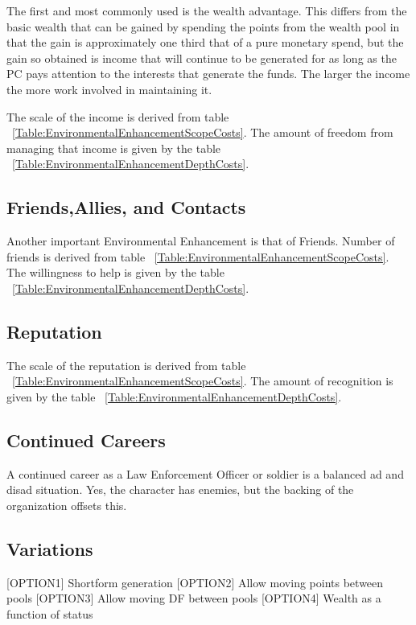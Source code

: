 The first and most commonly used is the wealth advantage. This differs
from the basic wealth that can be gained by spending the points from the
wealth pool in that the gain is approximately one third that of a pure
monetary spend, but the gain so obtained is income that will continue to
be generated for as long as the PC pays attention to the interests that
generate the funds. The larger the income the more work involved in
maintaining it.

The scale of the income is derived from table ~\ref{Table:EnvironmentalEnhancementScopeCosts}. The amount of
freedom from managing that income is given by the table
~\ref{Table:EnvironmentalEnhancementDepthCosts}.

\subsection{Friends,Allies, and Contacts}

Another important Environmental Enhancement is that of Friends. 
Number of friends is derived from table
~\ref{Table:EnvironmentalEnhancementScopeCosts}. The willingness to help 
is given by the table
~\ref{Table:EnvironmentalEnhancementDepthCosts}.

\subsection{Reputation}

The scale of the reputation is derived from table ~\ref{Table:EnvironmentalEnhancementScopeCosts}. The amount of
recognition is given by the table ~\ref{Table:EnvironmentalEnhancementDepthCosts}.

\subsection{Continued Careers}

A continued career as a Law Enforcement Officer or soldier is a
balanced ad and disad situation. Yes, the character has enemies, but the
backing of the organization offsets this.

\subsection{Variations}

[OPTION1] Shortform generation
[OPTION2] Allow moving points between pools
[OPTION3] Allow moving DF between pools
[OPTION4] Wealth as a function of status


